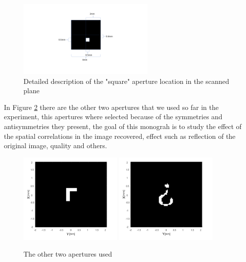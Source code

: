 \begin{figure}[h!]
\centering
 \includegraphics[width=0.6\textwidth]{Figures/mask1.pdf}
 \caption{Detailed description of the "square" aperture location in the scanned plane}
\label{fig:mask1} 
\end{figure}

In Figure \ref{fig:masks} there are the other two apertures that we used so far in the experiment, 
this apertures where selected because of the symmetries and antisymmetries they present, 
the goal of this monograh is to study the effect of the spatial correlations in the image
recovered, effect such as reflection of the original image, quality and others.  

\begin{figure}[h!]
\centering
{  \includegraphics[width=0.45\textwidth]{Figures/mask2.png} }
{  \includegraphics[width=0.45\textwidth]{Figures/mask3.png} }
\caption{The other two apertures used}
 \label{fig:masks}
\end{figure}

